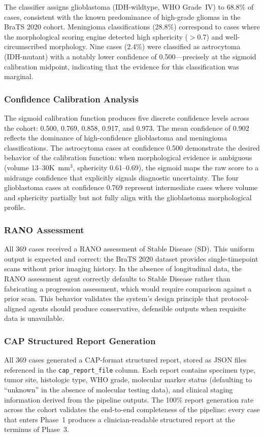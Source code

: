 The classifier assigns glioblastoma (IDH-wildtype, WHO Grade~IV) to 68.8\% of cases, consistent with the known predominance of high-grade gliomas in the BraTS 2020 cohort. Meningioma classifications (28.8\%) correspond to cases where the morphological scoring engine detected high sphericity ($>$0.7) and well-circumscribed morphology. Nine cases (2.4\%) were classified as astrocytoma (IDH-mutant) with a notably lower confidence of 0.500---precisely at the sigmoid calibration midpoint, indicating that the evidence for this classification was marginal.

\subsubsection{Confidence Calibration Analysis}
The sigmoid calibration function produces five discrete confidence levels across the cohort: 0.500, 0.769, 0.858, 0.917, and 0.973. The mean confidence of 0.902 reflects the dominance of high-confidence glioblastoma and meningioma classifications. The astrocytoma cases at confidence 0.500 demonstrate the desired behavior of the calibration function: when morphological evidence is ambiguous (volume 13--30K~mm$^3$, sphericity 0.61--0.69), the sigmoid maps the raw score to a midrange confidence that explicitly signals diagnostic uncertainty. The four glioblastoma cases at confidence 0.769 represent intermediate cases where volume and sphericity partially but not fully align with the glioblastoma morphological profile.

\subsubsection{RANO Assessment}
All 369 cases received a RANO assessment of Stable Disease (SD). This uniform output is expected and correct: the BraTS 2020 dataset provides single-timepoint scans without prior imaging history. In the absence of longitudinal data, the RANO assessment agent correctly defaults to Stable Disease rather than fabricating a progression assessment, which would require comparison against a prior scan. This behavior validates the system's design principle that protocol-aligned agents should produce conservative, defensible outputs when requisite data is unavailable.

\subsubsection{CAP Structured Report Generation}
All 369 cases generated a CAP-format structured report, stored as JSON files referenced in the \texttt{cap\_report\_file} column. Each report contains specimen type, tumor site, histologic type, WHO grade, molecular marker status (defaulting to ``unknown'' in the absence of molecular testing data), and clinical staging information derived from the pipeline outputs. The 100\% report generation rate across the cohort validates the end-to-end completeness of the pipeline: every case that enters Phase~1 produces a clinician-readable structured report at the terminus of Phase~3.


